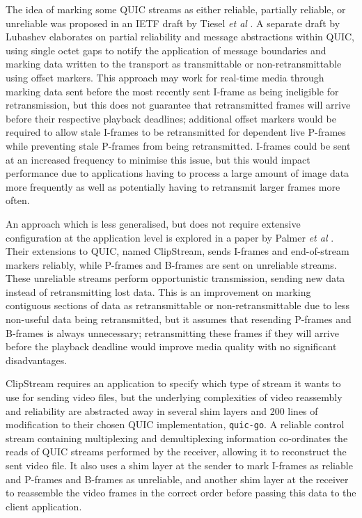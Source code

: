 \documentclass{mpaper}
\begin{document}
The idea of marking some QUIC streams as either reliable, partially reliable, or unreliable was proposed in an IETF draft by Tiesel \textit{et al} \cite{Tiesel2017}. A separate draft by Lubashev \cite{Lubashev2018} elaborates on partial reliability and message abstractions within QUIC, using single octet gaps to notify the application of message boundaries and marking data written to the transport as transmittable or non-retransmittable using offset markers. This approach may work for real-time media through marking data sent before the most recently sent I-frame as being ineligible for retransmission, but this does not guarantee that retransmitted frames will arrive before their respective playback deadlines; additional offset markers would be required to allow stale I-frames to be retransmitted for dependent live P-frames while preventing stale P-frames from being retransmitted. I-frames could be sent at an increased frequency to minimise this issue, but this would impact performance due to applications having to process a large amount of image data more frequently as well as potentially having to retransmit larger frames more often.

An approach which is less generalised, but does not require extensive configuration at the application level is explored in a paper by Palmer \textit{et al} \cite{Palmer2018}. Their extensions to QUIC, named ClipStream, sends I-frames and end-of-stream markers reliably, while P-frames and B-frames are sent on unreliable streams. These unreliable streams perform opportunistic transmission, sending new data instead of retransmitting lost data. This is an improvement on marking contiguous sections of data as retransmittable or non-retransmittable due to less non-useful data being retransmitted, but it assumes that resending P-frames and B-frames is always unnecessary; retransmitting these frames if they will arrive before the playback deadline would improve media quality with no significant disadvantages.

ClipStream requires an application to specify which type of stream it wants to use for sending video files, but the underlying complexities of video reassembly and reliability are abstracted away in several shim layers and 200 lines of modification to their chosen QUIC implementation, \texttt{quic-go}. A reliable control stream containing multiplexing and demultiplexing information co-ordinates the reads of QUIC streams performed by the receiver, allowing it to reconstruct the sent video file. It also uses a shim layer at the sender to mark I-frames as reliable and P-frames and B-frames as unreliable, and another shim layer at the receiver to reassemble the video frames in the correct order before passing this data to the client application.
\end{document}
